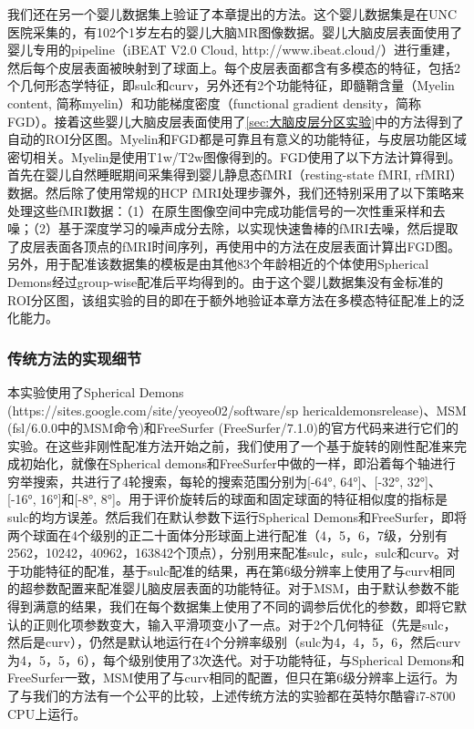 我们还在另一个婴儿数据集上验证了本章提出的方法。这个婴儿数据集是在UNC医院采集的，有102个1岁左右的婴儿大脑MR图像数据。婴儿大脑皮层表面使用了婴儿专用的pipeline\cite{li2015construction,li2014measuring,wang2018volume}（iBEAT V2.0 Cloud, http://www.ibeat.cloud/）进行重建，然后每个皮层表面被映射到了球面上。每个皮层表面都含有多模态的特征，包括2个几何形态学特征，即sulc和curv，另外还有2个功能特征，即髓鞘含量（Myelin content, 简称myelin）和功能梯度密度（functional gradient density，简称FGD）。接着这些婴儿大脑皮层表面使用了\ref{sec:大脑皮层分区实验}中的方法得到了自动的ROI分区图。Myelin和FGD都是可靠且有意义的功能特征，与皮层功能区域密切相关\cite{glasser2016multi}。Myelin是使用T1w/T2w图像得到的。FGD使用了以下方法计算得到。首先在婴儿自然睡眠期间采集得到婴儿静息态fMRI（resting-state fMRI, rfMRI）数据。然后除了使用常规的HCP fMRI处理步骤\cite{glasser2013minimal}外，我们还特别采用了以下策略\cite{hu2020disentangled}来处理这些fMRI数据：（1）在原生图像空间中完成功能信号的一次性重采样和去噪；（2）基于深度学习的噪声成分去除，以实现快速鲁棒的fMRI去噪，然后提取了皮层表面各顶点的fMRI时间序列，再使用\cite{huang2020construction,gordon2016generation}中的方法在皮层表面计算出FGD图。另外，用于配准该数据集的模板是由其他83个年龄相近的个体使用Spherical Demons\cite{yeo2009spherical}经过group-wise配准后平均得到的。由于这个婴儿数据集没有金标准的ROI分区图，该组实验的目的即在于额外地验证本章方法在多模态特征配准上的泛化能力。

\subsubsection{传统方法的实现细节}\label{sec:配准的基准方法}
本实验使用了Spherical Demons (https://sites.google.com/site/yeoyeo02/software/sp
hericaldemonsrelease)、MSM (fsl/6.0.0中的MSM命令)和FreeSurfer (FreeSurfer/7.1.0)的官方代码来进行它们的实验。在这些非刚性配准方法开始之前，我们使用了一个基于旋转的刚性配准来完成初始化，就像在Spherical demons\cite{yeo2009spherical}和FreeSurfer\cite{fischl2012freesurfer}中做的一样，即沿着每个轴进行穷举搜索，共进行了4轮搜索，每轮的搜索范围分别为[-64°, 64°]、[-32°, 32°]、[-16°, 16°]和[-8°, 8°]。用于评价旋转后的球面和固定球面的特征相似度的指标是sulc的均方误差。然后我们在默认参数下运行Spherical Demons和FreeSurfer，即将两个球面在4个级别的正二十面体分形球面上进行配准（4，5，6，7级，分别有2562，10242，40962，163842个顶点），分别用来配准sulc，sulc，sulc和curv。对于功能特征的配准，基于sulc配准的结果，再在第6级分辨率上使用了与curv相同的超参数配置来配准婴儿脑皮层表面的功能特征。对于MSM，由于默认参数不能得到满意的结果，我们在每个数据集上使用了不同的调参后优化的参数，即将它默认的正则化项参数变大，输入平滑项变小了一点。对于2个几何特征（先是sulc，然后是curv），仍然是默认地运行在4个分辨率级别（sulc为4，4，5，6，然后curv为4，5，5，6），每个级别使用了3次迭代。对于功能特征，与Spherical Demons和FreeSurfer一致，MSM使用了与curv相同的配置，但只在第6级分辨率上运行。为了与我们的方法有一个公平的比较，上述传统方法的实验都在英特尔酷睿i7-8700 CPU上运行。

